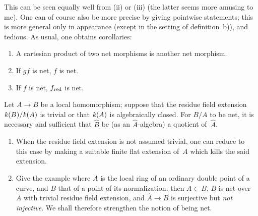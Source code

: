 This can be seen equally well from (ii) or (iii) (the latter seems
more amusing to me). One can of course also be more precise by
giving pointwise statements; this is more general only in appearance
(except in the setting of definition~b)), and tedious. As usual,
one obtains corollaries:

\begin{corollaries}
\label{I.3.6}
\begin{enumerate}
\item[(iv)] A cartesian product of two net morphisms is another
net morphism.
\item[(v)] If $gf$ is net, $f$ is net.
\item[(vi)] If $f$ is net, $f_{\text{\textup{red}}}$ is net.
\end{enumerate}
\end{corollaries}

\begin{proposition}
\label{I.3.7}
Let $A\to B$ be a local homomorphism; suppose that the residue
field extension $\mathit{k}(B)/\mathit{k}(A)$ is trivial or that $\mathit{k}(A)$
is algebraically closed. For $B/A$ to be net, it is necessary and
sufficient that $\widehat{B}$ be (as an $\widehat{A}$-algebra)
a quotient of~$\widehat{A}$.
\end{proposition}

\begin{remarks}
\begin{enumerate}
\item[--] When the residue field extension is not assumed trivial,
one can reduce to this case by making a suitable finite flat
extension of~$A$ which kills the said extension.
\item[--] Give the example where $A$ is the local ring of an
ordinary double point of a curve, and $B$ that of a point of its
normalization: then $A\subset B$, $B$ is net over
$A$ with trivial residue field extension, and
$\widehat{A}\to\widehat{B}$ is surjective but \emph{not injective}.
We shall therefore strengthen the notion of being net.
\end{enumerate}
\end{remarks}
